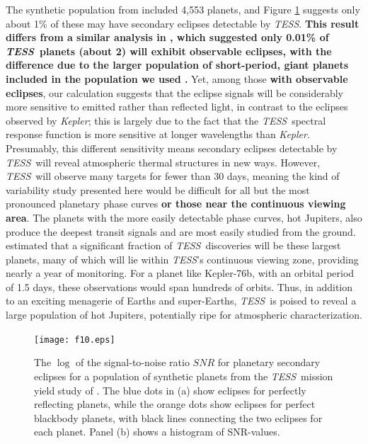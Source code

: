 \documentclass[manuscript]{aastex62}
\newcommand{\kepler}{{\it Kepler}}
\newcommand{\tess}{{\it TESS}}
\begin{document}
The synthetic population from \citet{2018ApJS..239....2B} included 4,553 planets, and Figure \ref{fig:eclipse_estimates} suggests only about 1\% of these may have secondary eclipses detectable by \tess. \textbf{This result differs from a similar analysis in \citet{2015ApJ...809...77S}, which suggested only 0.01\% of \tess\ planets (about 2) will exhibit observable eclipses, with the difference due to the larger population of short-period, giant planets included in the population we used \citep{2018ApJS..239....2B}.} Yet, among those \textbf{with observable eclipses}, our calculation suggests that the eclipse signals will be considerably more sensitive to emitted rather than reflected light, in contrast to the eclipses observed by \kepler; this is largely due to the fact that the \tess\ spectral response function is more sensitive at longer wavelengths than \kepler. Presumably, this different sensitivity means secondary eclipses detectable by \tess\ will reveal atmospheric thermal structures in new ways. However, \tess\ will observe many targets for fewer than 30 days, meaning the kind of variability study presented here would be difficult for all but the most pronounced planetary phase curves \textbf{or those near the continuous viewing area}. The planets with the more easily detectable phase curves, hot Jupiters, also produce the deepest transit signals and are most easily studied from the ground. \citet{2018ApJS..239....2B} estimated that a significant fraction of \tess\ discoveries will be these largest planets, many of which will lie within \tess's continuous viewing zone, providing nearly a year of monitoring. For a planet like Kepler-76b, with an orbital period of 1.5 days, these observations would span hundreds of orbits. Thus, in addition to an exciting menagerie of Earths and super-Earths, \tess\ is poised to reveal a large population of hot Jupiters, potentially ripe for atmospheric characterization. 

\begin{figure}
\texttt{[image: f10.eps]}
\caption{The $\log$ of the signal-to-noise ratio $SNR$ for planetary secondary eclipses for a population of synthetic planets from the \tess\ mission yield study of \citet{2018ApJS..239....2B}. The blue dots in (a) show eclipses for perfectly reflecting planets, while the orange dots show eclipses for perfect blackbody planets, with black lines connecting the two eclipses for each planet. Panel (b) shows a histogram of SNR-values. \label{fig:eclipse_estimates}}
\end{figure}
\end{document}

